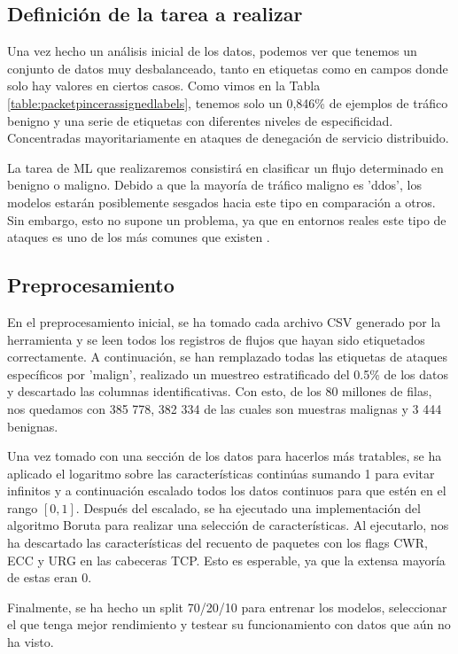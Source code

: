 \color{blue} %
\subsection{Definición de la tarea a realizar}

Una vez hecho un análisis inicial de los datos, podemos ver que tenemos un conjunto de datos muy desbalanceado, tanto en etiquetas como en campos donde solo hay valores en ciertos casos. Como vimos en la Tabla \ref{table:packetpincerassignedlabels}, tenemos solo un 0,846\% de ejemplos de tráfico benigno y una serie de etiquetas con diferentes niveles de especificidad. Concentradas mayoritariamente en ataques de denegación de servicio distribuido. 

La tarea de ML que realizaremos consistirá en clasificar un flujo determinado en benigno o maligno. Debido a que la mayoría de tráfico maligno es 'ddos', los modelos estarán posiblemente sesgados hacia este tipo en comparación a otros. Sin embargo, esto no supone un problema, ya que en entornos reales este tipo de ataques es uno de los más comunes que existen \cite{topciberattacks}.

\subsection{Preprocesamiento}

En el preprocesamiento inicial, se ha tomado cada archivo CSV generado por la herramienta y se leen todos los registros de flujos que hayan sido etiquetados correctamente. A continuación, se han remplazado todas las etiquetas de ataques específicos por 'malign', realizado un muestreo estratificado del 0.5\% de los datos y descartado las columnas identificativas. Con esto, de los 80 millones de filas, nos quedamos con 385 778, 382 334 de las cuales son muestras malignas y 3 444 benignas.

Una vez tomado con una sección de los datos para hacerlos más tratables, se ha aplicado el logaritmo sobre las características continúas sumando 1 para evitar infinitos y a continuación escalado todos los datos continuos para que estén en el rango $[0, 1]$. Después del escalado, se ha ejecutado una implementación del algoritmo Boruta \cite{borutapy} para realizar una selección de características. Al ejecutarlo, nos ha descartado las características del recuento de paquetes con los flags CWR, ECC y URG en las cabeceras TCP. Esto es esperable, ya que la extensa mayoría de estas eran 0.

Finalmente, se ha hecho un split 70/20/10 para entrenar los modelos, seleccionar el que tenga mejor rendimiento y testear su funcionamiento con datos que aún no ha visto. 

